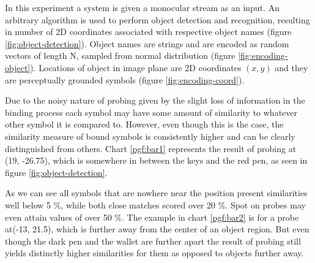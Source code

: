 \documentclass[conference]{IEEEtran}
\begin{document}
	In this experiment a system is given a monocular stream as an input. An arbitrary algorithm is used to perform object detection and recognition, resulting in number of 2D coordinates associated with respective object names (figure \ref{fig:object-detection}). Object names are strings and are encoded as random vectors of length N, sampled from normal distribution (figure \ref{fig:encoding-object}). Locations of object in image plane are 2D coordinates $(x,y)$ and they are perceptually grounded symbols (figure \ref{fig:encoding-coord}).
	
	
	Due to the noisy nature of probing given by the slight loss of information in the binding process each symbol may have some amount of similarity to whatever other symbol it is compared to. However, even though this is the case, the similarity measure of bound symbols is consistently higher and can be clearly distinguished from others. Chart \ref{pgf:bar1} represents the result of probing at (19, -26.75), which is somewhere in between the keys and the red pen, as seen in figure \ref{fig:object-detection}.
	
	 As we can see all symbols that are nowhere near the position present similarities well below 5 \%, while both close matches scored over 20 \%. Spot on probes may even attain values of over 50 \%. The example in chart \ref{pgf:bar2} is for a probe at(-13, 21.5), which is further away from the center of an object region. But even though the dark pen and the wallet are further apart the result of probing still yields distinctly higher similarities for them as opposed to objects further away. 
	
\end{document}
